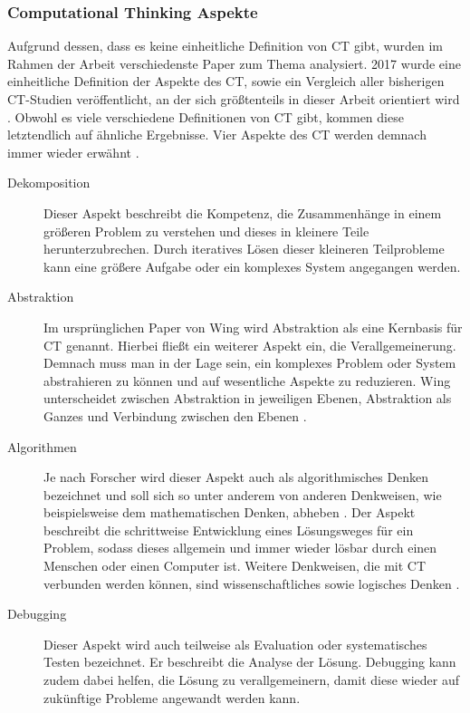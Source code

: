 \subsubsection{Computational Thinking Aspekte}
Aufgrund dessen, dass es keine einheitliche Definition von CT gibt, wurden im Rahmen der Arbeit verschiedenste Paper zum Thema analysiert. 2017 wurde eine einheitliche Definition der Aspekte des CT, sowie ein Vergleich aller bisherigen CT-Studien veröffentlicht, an der sich größtenteils in dieser Arbeit orientiert wird \cite{schute}.
Obwohl es viele verschiedene Definitionen von CT gibt, kommen diese letztendlich auf ähnliche Ergebnisse. Vier Aspekte des CT werden demnach immer wieder erwähnt \cite{schute}.

\begin{description}
    \item[Dekomposition] Dieser Aspekt beschreibt die Kompetenz, die Zusammenhänge in einem größeren Problem zu verstehen und dieses in kleinere Teile herunterzubrechen. Durch iteratives Lösen dieser kleineren Teilprobleme kann eine größere Aufgabe oder ein komplexes System angegangen werden.
    \item[Abstraktion] Im ursprünglichen Paper von Wing \cite{wing2006} wird Abstraktion als eine Kernbasis für CT genannt. Hierbei fließt ein weiterer Aspekt ein, die Verallgemeinerung.
    Demnach muss man in der Lage sein, ein komplexes Problem oder System abstrahieren zu können und auf wesentliche Aspekte zu reduzieren. Wing unterscheidet zwischen Abstraktion in jeweiligen Ebenen, Abstraktion als Ganzes und Verbindung zwischen den Ebenen \cite{wing2008}.
    \item[Algorithmen] Je nach Forscher wird dieser Aspekt auch als algorithmisches Denken bezeichnet und soll sich so unter anderem von anderen Denkweisen, wie beispielsweise dem mathematischen Denken, abheben \cite{schute}. Der Aspekt beschreibt die schrittweise Entwicklung eines Lösungsweges für ein Problem, sodass dieses allgemein und immer wieder lösbar durch einen Menschen oder einen Computer ist. Weitere Denkweisen, die mit CT verbunden werden können, sind wissenschaftliches sowie logisches Denken \cite{curzon}.
    \item[Debugging] Dieser Aspekt wird auch teilweise als Evaluation \cite{curzon} oder systematisches Testen \cite{wing2006} bezeichnet. Er beschreibt die Analyse der Lösung. Debugging kann zudem dabei helfen, die Lösung zu verallgemeinern, damit diese wieder auf zukünftige Probleme angewandt werden kann.
\end{description}

